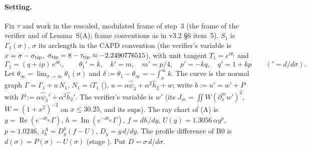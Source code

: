 
\paragraph{Setting.} Fix $\tau$ and work in the rescaled, modulated frame of step~3 (the frame of the verifier and of Lemma~S(A); frame conventions as in v3.2 \S6 item~5). $S_1$ is $\Gamma_1(\sigma)$, $\sigma$ its arclength in the CAPD convention (the verifier's variable is $x=\sigma-\sigma_{\rm tip}$, $\sigma_{\rm tip}=8-\tau_{\rm tip}\approx-2.2490776515$), with unit tangent $T_1=e^{i\theta_1}$ and
\[
\Gamma_1=(q+ip)\,e^{i\theta_1},\qquad \theta_1'=k,\quad k'=m,\quad m'=p/4,\quad p'=-kq,\quad q'=1+kp\qquad({}'=d/d\sigma).
\]
Let $\theta_\infty=\lim_{\sigma\to\infty}\theta_1(\sigma)$ and $\delta:=\theta_1-\theta_\infty=-\int_\sigma^\infty k$. The curve is the normal graph $\Gamma=\Gamma_1+u\,N_1$, $N_1=iT_1$ (), $u=\alpha\hat\psi_3+\alpha^2\hat h_2+w$; write $b:=u'=w'+P$ with $P:=\alpha\hat\psi_3'+\alpha^2\hat h_2'$. The verifier's variable is $w'$ (its $J_m=\iint W(\partial_x^mw')^2$, $W=(1+x^2)^{-2}$ on $x\le30.25$, and its sups). The ray chart of (A) is $y=\operatorname{Re}(e^{-i\theta_\infty}\Gamma)$, $h=\operatorname{Im}(e^{-i\theta_\infty}\Gamma)$, $f=dh/dy$, $U(y)=1.3056\,\alpha y^p$, $p=1.0246$, $z^A_k=D_y^k(f-U)$, $D_y=y\,d/dy$. The profile difference of B0 is $d(\sigma)=P(\sigma)-U(\sigma)$ (stage ). Put $D=\sigma\,d/d\sigma$.

